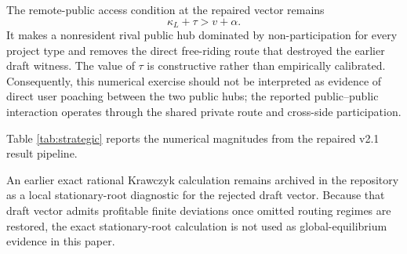 The remote-public access condition at the repaired vector remains
\[
\kappa_L+\tau>v+\alpha.
\]
It makes a nonresident rival public hub dominated by non-participation for every project type and removes the direct free-riding route that destroyed the earlier draft witness. The value of $\tau$ is constructive rather than empirically calibrated. Consequently, this numerical exercise should not be interpreted as evidence of direct user poaching between the two public hubs; the reported public--public interaction operates through the shared private route and cross-side participation.

Table \ref{tab:strategic} reports the numerical magnitudes from the repaired v2.1 result pipeline.

\begin{table}[t]
\centering
\caption{Strategic interaction at the repaired reported stationary candidates}
\label{tab:strategic}

\end{table}

An earlier exact rational Krawczyk calculation remains archived in the repository as a local stationary-root diagnostic for the rejected draft vector. Because that draft vector admits profitable finite deviations once omitted routing regimes are restored, the exact stationary-root calculation is not used as global-equilibrium evidence in this paper.
